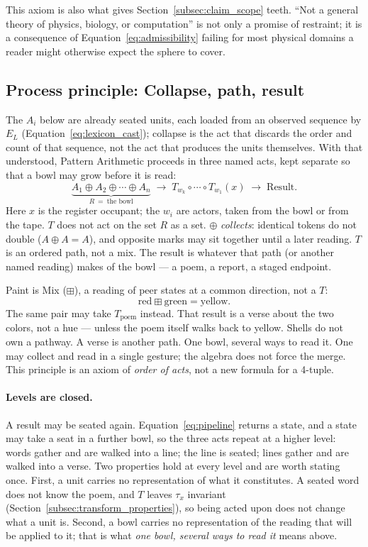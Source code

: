 \documentclass[12pt, a4paper]{article}
\begin{document}
This axiom is also what gives
Section~\ref{subsec:claim_scope} teeth. ``Not a general theory of
physics, biology, or computation'' is not only a promise of
restraint; it is a consequence of Equation~\eqref{eq:admissibility}
failing for most physical domains a reader might otherwise expect
the sphere to cover.

\subsection{Process principle: Collapse, path, result}
\label{subsec:process_principle}
The $A_i$ below are already seated units, each loaded from an
observed sequence by $E_L$ (Equation~\eqref{eq:lexicon_cast});
collapse is the act that discards the order and count of that
sequence, not the act that produces the units themselves. With that
understood, Pattern Arithmetic proceeds in three named acts, kept separate so that a bowl may grow before it is read:
\begin{equation}
    \underbrace{A_1 \oplus A_2 \oplus \cdots \oplus A_n}_{R\ =\ \text{the bowl}}
    \;\longrightarrow\;
    T_{w_k}\circ \cdots \circ T_{w_1}(x)
    \;\longrightarrow\;
    \text{Result}.
    \label{eq:pipeline}
\end{equation}
Here $x$ is the register occupant; the $w_i$ are actors, taken from
the bowl or from the tape. $T$ does not act on the set $R$ as a set.
$\oplus$ \emph{collects}: identical tokens do not double ($A \oplus A = A$), and opposite marks may sit together until a later reading. $T$ is an ordered path, not a mix. The result is whatever that path (or another named reading) makes of the bowl --- a poem, a report, a staged endpoint.

Paint is Mix ($\boxplus$), a reading of peer states at a common direction, not a $T$:
\[
\mathrm{red}\boxplus\mathrm{green} = \mathrm{yellow}.
\]
The same pair may take $T_{\mathrm{poem}}$ instead. That result is a
verse about the two colors, not a hue --- unless the poem itself
walks back to yellow. Shells do not own a pathway. A verse is another
path. One bowl, several ways to read it. One may collect
and read in a single gesture; the algebra does not force the merge.
This principle is an axiom of \emph{order of acts}, not a new formula
for a 4-tuple.

\paragraph{Levels are closed.}
A result may be seated again. Equation~\eqref{eq:pipeline} returns a
state, and a state may take a seat in a further bowl, so the three
acts repeat at a higher level: words gather and are walked into a
line; the line is seated; lines gather and are walked into a verse.
Two properties hold at every level and are worth stating once. First,
a unit carries no representation of what it constitutes. A seated word
does not know the poem, and $T$ leaves $\tau_x$ invariant
(Section~\ref{subsec:transform_properties}), so being acted upon does
not change what a unit is. Second, a bowl carries no representation of
the reading that will be applied to it; that is what \emph{one bowl,
several ways to read it} means above.
\end{document}
